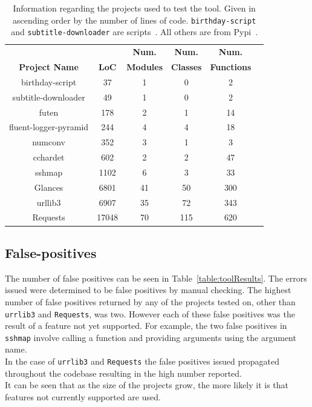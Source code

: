 \documentclass[12pt, titlepage]{article}
\begin{document}
	\begin{table}[bp]
	\centering
    \begin{tabular}{ | c | c | c | c | c | c |}
    \hline
     &  & \textbf{Num.} & \textbf{Num.}  & \textbf{Num.}  \\
    \textbf{Project Name} & \textbf{LoC} & \textbf{Modules} & \textbf{Classes} & \textbf{Functions} \\ \hline
    birthday-script & 37 & 1 & 0 & 2 \\ \hline
    subtitle-downloader & 49 & 1 & 0 & 2 \\ \hline
    futen & 178 & 2 & 1 & 14 \\ \hline
    fluent-logger-pyramid & 244 & 4 & 4 & 18 \\ \hline
    numconv & 352 & 3 & 1 & 3 \\ \hline
    cchardet & 602 & 2 & 2 & 47  \\ \hline
    sshmap & 1102 & 6 & 3 & 33 \\ \hline
    Glances & 6801 & 41 & 50 & 300 \\ \hline
    urllib3 & 6907 & 35 & 72 & 343 \\ \hline
    Requests & 17048 & 70 & 115 & 620 \\ \hline
    \end{tabular}
    \caption{Information regarding the projects used to test the tool. Given in ascending order by the number of lines of code. \texttt{birthday-script} and \texttt{subtitle-downloader} are scripts~\cite{pythonScripts}. All others are from Pypi~\cite{python3Projects}.}
	\label{table:toolTests}
    \end{table}
    


\subsection{False-positives}
The number of false positives can be seen in Table~\ref{table:toolResults}. The errors issued were determined to be false positives by manual checking. The highest number of false positives returned by any of the projects tested on, other than \texttt{urrlib3} and \texttt{Requests}, was two. However each of these false positives was the result of a feature not yet supported. For example, the two false positives in \texttt{sshmap} involve calling a function and providing arguments using the argument name. \\
\indent In the case of \texttt{urrlib3} and \texttt{Requests} the false positives issued propagated throughout the codebase resulting in the high number reported. \\
\indent It can be seen that as the size of the projects grow, the more likely it is that features not currently supported are used.
\end{document}
